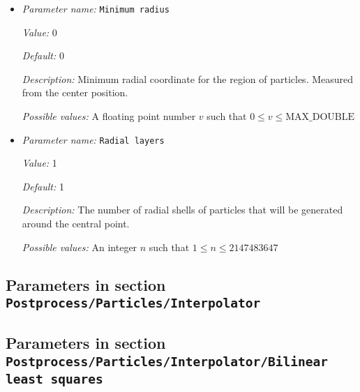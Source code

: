 \begin{itemize}
{\it Value:} 0


{\it Default:} 0


{\it Description:} Minimum longitude coordinate for the region of particles in degrees. Measured from the center position.


{\it Possible values:} A floating point number $v$ such that $-180 \leq v \leq 360$
\item {\it Parameter name:} {\tt Minimum radius}
\label{parameters:Postprocess/Particles/Generator/Uniform radial/Minimum radius}


{\it Value:} 0


{\it Default:} 0


{\it Description:} Minimum radial coordinate for the region of particles. Measured from the center position.


{\it Possible values:} A floating point number $v$ such that $0 \leq v \leq \text{MAX\_DOUBLE}$
\item {\it Parameter name:} {\tt Radial layers}
\label{parameters:Postprocess/Particles/Generator/Uniform radial/Radial layers}


{\it Value:} 1


{\it Default:} 1


{\it Description:} The number of radial shells of particles that will be generated around the central point.


{\it Possible values:} An integer $n$ such that $1\leq n \leq 2147483647$
\end{itemize}

\subsection{Parameters in section \tt Postprocess/Particles/Interpolator}
\label{parameters:Postprocess/Particles/Interpolator}


\subsection{Parameters in section \tt Postprocess/Particles/Interpolator/Bilinear least squares}
\label{parameters:Postprocess/Particles/Interpolator/Bilinear_20least_20squares}

